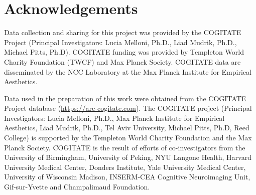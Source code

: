 \documentclass[twocolumn]{article}
\begin{document}
	\section*{Acknowledgements}
	Data collection and sharing for this project was provided by the COGITATE Project (Principal Investigators: Lucia Melloni, Ph.D., Liad Mudrik, Ph.D., Michael Pitts, Ph.D). COGITATE funding was provided by Templeton World Charity Foundation (TWCF) and Max Planck Society. COGITATE data are disseminated by the NCC Laboratory at the Max Planck Institute for Empirical Aesthetics.
	
	Data used in the preparation of this work were obtained from the COGITATE Project database (\url{https://arc-cogitate.com}). The COGITATE project (Principal Investigators: Lucia Melloni, Ph.D., Max Planck Institute for Empirical Aesthetics, Liad Mudrik, Ph.D., Tel Aviv University, Michael Pitts, Ph.D, Reed College) is supported by the Templeton World Charity Foundation and the Max Planck Society. COGITATE is the result of efforts of co-investigators from the University of Birmingham, University of Peking, NYU Langone Health, Harvard University Medical Center, Donders Institute, Yale University Medical Center, University of Wisconsin Madison, INSERM-CEA Cognitive Neuroimaging Unit, Gif-sur-Yvette and Champalimaud Foundation.
	
\end{document}
